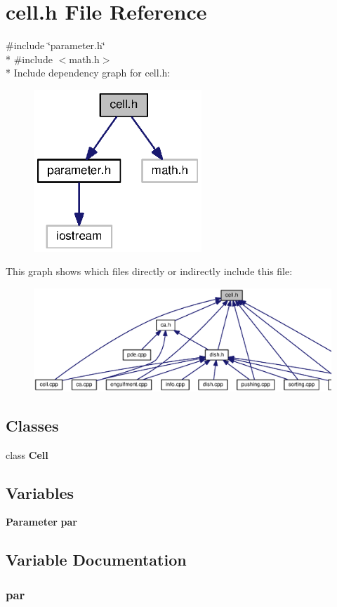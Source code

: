 \section{cell.\-h File Reference}
\label{cell_8h}
{\ttfamily \#include \char`\"{}parameter.\-h\char`\"{}}\\*
{\ttfamily \#include $<$math.\-h$>$}\\*
Include dependency graph for cell.\-h\-:
\nopagebreak
\begin{figure}[H]
\begin{center}
\leavevmode
\includegraphics[width=179pt]{cell_8h__incl}
\end{center}
\end{figure}
This graph shows which files directly or indirectly include this file\-:
\nopagebreak
\begin{figure}[H]
\begin{center}
\leavevmode
\includegraphics[width=350pt]{cell_8h__dep__incl}
\end{center}
\end{figure}
\subsection*{Classes}
\begin{DoxyCompactItemize}
\item 
class {\bf Cell}
\end{DoxyCompactItemize}
\subsection*{Variables}
\begin{DoxyCompactItemize}
\item 
{\bf Parameter} {\bf par}
\end{DoxyCompactItemize}


\subsection{Variable Documentation}
\subsubsection[{par}]{ par}\label{cell_8h_aa11a52593a908c20a7259a3e72c0b348}
